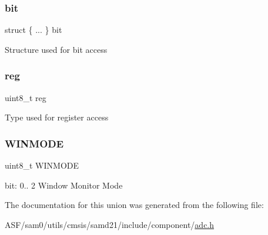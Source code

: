 \subsubsection{\texorpdfstring{bit}{bit}}
{\footnotesize\ttfamily struct \{ ... \}   bit}

Structure used for bit access \mbox{\label{union_a_d_c___w_i_n_c_t_r_l___type_a9428adc9af4653a2050e2536b55dec8d}} 
\subsubsection{\texorpdfstring{reg}{reg}}
{\footnotesize\ttfamily uint8\+\_\+t reg}

Type used for register access \mbox{\label{union_a_d_c___w_i_n_c_t_r_l___type_a286eda61ded31ed71d6222cc91dfb304}} 
\subsubsection{\texorpdfstring{WINMODE}{WINMODE}}
{\footnotesize\ttfamily uint8\+\_\+t W\+I\+N\+M\+O\+DE}

bit\+: 0.. 2 Window Monitor Mode 

The documentation for this union was generated from the following file\+:\begin{DoxyCompactItemize}
\item 
A\+S\+F/sam0/utils/cmsis/samd21/include/component/\mbox{\hyperlink{component_2adc_8h}{adc.\+h}}\end{DoxyCompactItemize}
